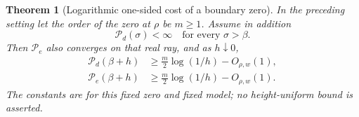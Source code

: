 \documentclass[11pt]{article}
\newtheorem{theorem}{Theorem}[section]
\theoremstyle{definition}
\begin{document}
\begin{theorem}[Logarithmic one-sided cost of a boundary zero]
\label{thm:prime-zero-logarithmic-cost}
In the preceding setting let the order of the zero at
$\rho$ be $m\ge1$. Assume in addition
\begin{equation}
       \mathcal P_d(\sigma)<\infty
                           \quad\text{for every }\sigma>\beta .
 \label{eq:prime-zero-cost-right-convergence}
\end{equation}
Then $\mathcal P_e$ also converges on that real ray, and
as $h\downarrow0$,
\begin{equation}
 \begin{aligned}
 \mathcal P_d(\beta+h)&\ge\frac m2\log(1/h)-O_{\rho,w}(1),\\
 \mathcal P_e(\beta+h)&\ge\frac m2\log(1/h)-O_{\rho,w}(1).
 \end{aligned}
 \label{eq:prime-zero-logarithmic-mass-cost}
\end{equation}
The constants are for this fixed zero and fixed model;
no height-uniform bound is asserted.
\end{theorem}
\end{document}
